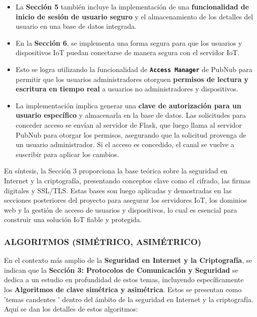 \documentclass{report}
\begin{document}
\begin{itemize}
\begin{itemize}
        \begin{itemize}
            \item La \textbf{Sección 5} también incluye la implementación de una \textbf{funcionalidad de inicio de sesión de usuario seguro} y el 
            almacenamiento de los detalles del usuario en una base de datos integrada.
            \item En la \textbf{Sección 6}, se implementa una forma segura para que los usuarios y dispositivos IoT puedan conectarse de manera segura 
            con el servidor IoT.
            \item Esto se logra utilizando la funcionalidad de \textbf{\texttt{Access Manager}} de PubNub para permitir que los usuarios administradores 
            otorguen \textbf{permisos de lectura y escritura en tiempo real} a usuarios no administradores y dispositivos.
            \item La implementación implica generar una \textbf{clave de autorización para un usuario específico} y almacenarla en la base de datos. 
            Las solicitudes para conceder acceso se envían al servidor de Flask, que luego llama al servidor PubNub para otorgar los permisos, asegurando 
            que la solicitud provenga de un usuario administrador. Si el acceso es concedido, el canal se vuelve a suscribir para aplicar los cambios.
        \end{itemize}
    \end{itemize}
\end{itemize}
En síntesis, la Sección 3 proporciona la base teórica sobre la seguridad en Internet y la criptografía, presentando conceptos clave como el cifrado, 
las firmas digitales y SSL/TLS. Estas bases son luego aplicadas y demostradas en las secciones posteriores del proyecto para asegurar los servidores IoT, 
los dominios web y la gestión de acceso de usuarios y dispositivos, lo cual es esencial para construir una solución IoT fiable y protegida.

\subsubsection{ALGORITMOS (SIMÉTRICO, ASIMÉTRICO)}
En el contexto más amplio de la \textbf{Seguridad en Internet y la Criptografía}, se  indican que la \textbf{Sección 3: Protocolos de Comunicación 
y Seguridad} se dedica a un estudio en profundidad de estos temas, incluyendo específicamente los \textbf{Algoritmos de clave simétrica y asimétrica}. 
Estos se presentan como  'temas candentes ' dentro del ámbito de la seguridad en Internet y la criptografía. Aquí se dan los detalles de estos algoritmos:
\end{document}
